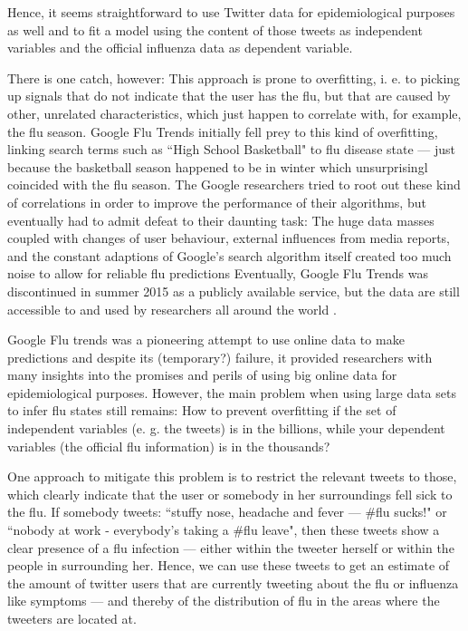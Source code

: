 \documentclass[11pt, a4paper,twoside]{report}\usepackage[]{graphicx}\usepackage[]{color}
\begin{document}
Hence, it seems straightforward to use Twitter data for epidemiological purposes as well and to fit a model using the content of those tweets as independent variables and the official influenza data as dependent variable.

There is one catch, however: This approach is prone to overfitting, i. e. to picking up signals that do not indicate that the user has the flu, but that are caused by other, unrelated characteristics, which just happen to correlate with, for example, the flu season. Google Flu Trends \citep{ginsberg_detecting_2009} initially fell prey to this kind of overfitting, linking search terms such as ``High School Basketball" to flu disease state --- just because the basketball season happened to be in winter which unsurprisingl coincided with the flu season. The Google researchers tried to root out these kind of correlations in order to improve the performance of their algorithms, but eventually had to admit defeat to their daunting task: The huge data masses coupled with changes of user behaviour, external influences from media reports, and the constant adaptions of Google's search algorithm itself created too much noise to allow for reliable flu predictions \citep{olson_reassessing_2013,butler_when_2013,lazer_parable_2014} Eventually, Google Flu Trends was discontinued in summer 2015 as a publicly available service, but the data are still accessible to and used by researchers all around the world \citep{GFT_nextchapter_2015}.

Google Flu trends was a pioneering attempt to use online data to make predictions and despite its (temporary?) failure, it provided researchers with many insights into the promises and perils of using big online data for epidemiological purposes. However, the main problem when using large data sets to infer flu states still remains: How to prevent overfitting if the set of independent variables (e. g. the tweets) is in the billions, while your dependent variables (the official flu information) is in the thousands?

One approach to mitigate this problem is to restrict the relevant tweets to those, which clearly indicate that the user or somebody in her surroundings fell sick to the flu. If somebody tweets: ``stuffy nose, headache and fever --- \#flu sucks!" or ``nobody at work - everybody's taking a \#flu leave", then these tweets show a clear presence of a flu infection --- either within the tweeter herself or within the people in surrounding her. Hence, we can use these tweets to get an estimate of the amount of twitter users that are currently tweeting about the flu or influenza like symptoms --- and thereby of the distribution of flu in the areas where the tweeters are located at.
\end{document}
